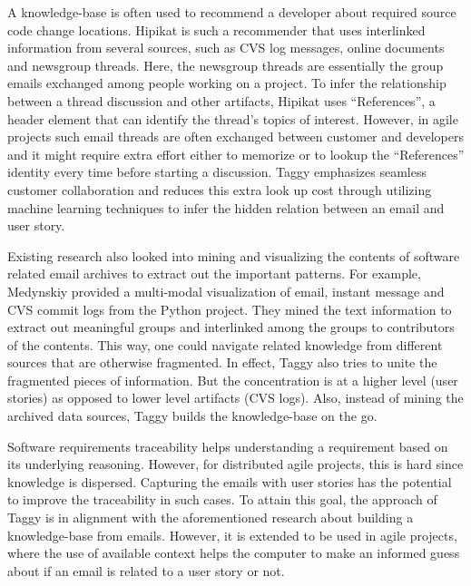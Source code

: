 A knowledge-base is often used to recommend a developer about required source code change locations. Hipikat is such a recommender that uses interlinked information from several sources, such as CVS log messages, online documents and newsgroup threads\cite{hipikat}. Here, the newsgroup threads are essentially the group emails exchanged among people working on a project. To infer the relationship between a thread discussion and other artifacts, Hipikat uses ``References'', a header element that can identify the thread's topics of interest. However, in agile projects such email threads are often exchanged between customer and developers and it might require extra effort either to memorize or to lookup the ``References'' identity every time before starting a discussion. Taggy emphasizes seamless customer collaboration and reduces this extra look up cost through utilizing machine learning techniques to infer the hidden relation between an email and user story.

Existing research also looked into mining and visualizing the contents of software related email archives to extract out the important patterns. For example, Medynskiy provided a multi-modal visualization of email, instant message and CVS commit logs from the Python project\cite{using_hybrid}. They mined the text information to extract out meaningful groups and interlinked among the groups to contributors of the contents. This way, one could navigate related knowledge from different sources that are otherwise fragmented. In effect, Taggy also tries to unite the fragmented pieces of information. But the concentration is at a higher level (user stories) as opposed to lower level artifacts (CVS logs). Also, instead of mining the archived data sources, Taggy builds the knowledge-base on the go.

Software requirements traceability helps understanding a requirement based on its underlying reasoning\cite{requirment_traceability}. However, for distributed agile projects, this is hard since knowledge is dispersed. Capturing the emails with user stories has the potential to improve the traceability in such cases. To attain this goal, the approach of Taggy is in alignment with the aforementioned research about building a knowledge-base from emails. However, it is extended to be used in agile projects, where the use of available context helps the computer to make an informed guess about if an email is related to a user story or not.

